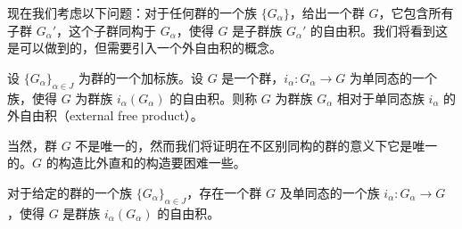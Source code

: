 \documentclass[../../main.tex]{subfiles}
\begin{document}
现在我们考虑以下问题：对于任何群的一个族 $\{G_\alpha\}$，给出一个群 $G$，它包含所有子群 $G_\alpha'$，这个子群同构于 $G_\alpha$，使得 $G$ 是子群族 $G_\alpha'$ 的自由积。我们将看到这是可以做到的，但需要引入一个外自由积的概念。

\begin{definition}[外自由积]\label{definition:ch11-external-free-product}
设 $\{G_\alpha\}_{\alpha\in J}$ 为群的一个加标族。设 $G$ 是一个群，$i_\alpha:G_\alpha\to G$ 为单同态的一个族，使得 $G$ 为群族 $i_\alpha(G_\alpha)$ 的自由积。则称 $G$ 为群族 $G_\alpha$ 相对于单同态族 $i_\alpha$ 的外自由积（external free product）。
\end{definition}

当然，群 $G$ 不是唯一的，然而我们将证明在不区别同构的群的意义下它是唯一的。$G$ 的构造比外直和的构造要困难一些。

\begin{theorem}[外自由积的存在性]\label{theorem:ch11-external-free-product-existence}
对于给定的群的一个族 $\{G_\alpha\}_{\alpha\in J}$，存在一个群 $G$ 及单同态的一个族 $i_\alpha:G_\alpha\to G$，使得 $G$ 是群族 $i_\alpha(G_\alpha)$ 的自由积。
\end{theorem}
\end{document}
